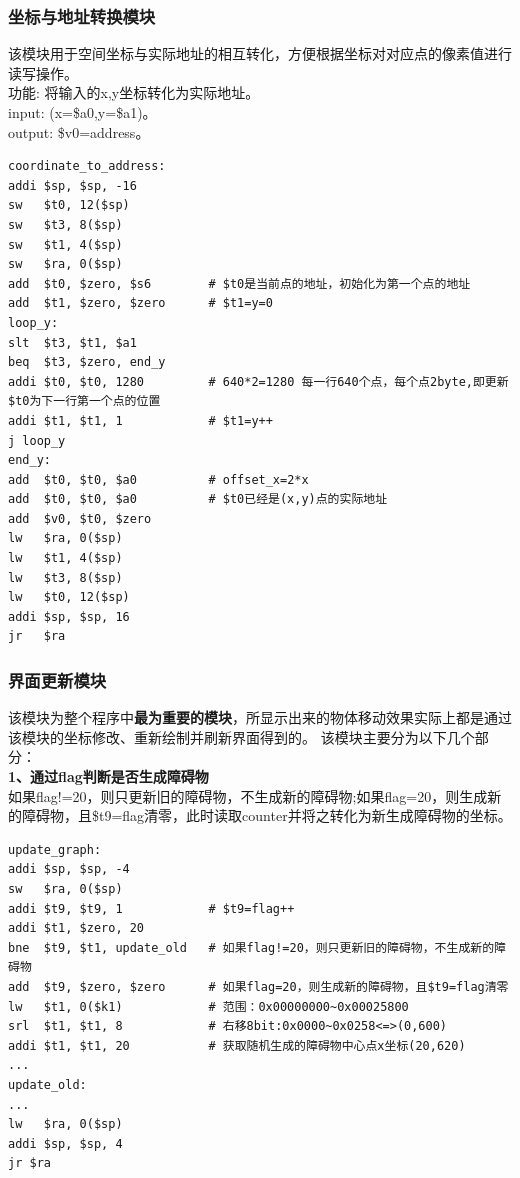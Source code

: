 \subsubsection{坐标与地址转换模块}
该模块用于空间坐标与实际地址的相互转化，方便根据坐标对对应点的像素值进行读写操作。\\
功能: 将输入的x,y坐标转化为实际地址。\\
input: (x=\$a0,y=\$a1)。\\
output: \$v0=address。\\

\begin{lstlisting}[frame=shadowbox]
coordinate_to_address:
addi $sp, $sp, -16
sw   $t0, 12($sp)
sw   $t3, 8($sp)
sw   $t1, 4($sp)
sw   $ra, 0($sp)
add  $t0, $zero, $s6        # $t0是当前点的地址，初始化为第一个点的地址
add  $t1, $zero, $zero      # $t1=y=0
loop_y:
slt  $t3, $t1, $a1 
beq  $t3, $zero, end_y
addi $t0, $t0, 1280         # 640*2=1280 每一行640个点，每个点2byte,即更新$t0为下一行第一个点的位置
addi $t1, $t1, 1            # $t1=y++
j loop_y
end_y:
add  $t0, $t0, $a0          # offset_x=2*x
add  $t0, $t0, $a0          # $t0已经是(x,y)点的实际地址
add  $v0, $t0, $zero
lw   $ra, 0($sp)
lw   $t1, 4($sp)
lw   $t3, 8($sp)
lw   $t0, 12($sp)
addi $sp, $sp, 16
jr   $ra
\end{lstlisting}

\subsubsection{界面更新模块}
该模块为整个程序中\textbf{最为重要的模块}，所显示出来的物体移动效果实际上都是通过该模块的坐标修改、重新绘制并刷新界面得到的。
该模块主要分为以下几个部分：\\

\textbf{1、通过flag判断是否生成障碍物}\\
如果flag!=20，则只更新旧的障碍物，不生成新的障碍物;如果flag=20，则生成新的障碍物，且\$t9=flag清零，此时读取counter并将之转化为新生成障碍物的坐标。\\

\begin{lstlisting}[frame=shadowbox]
update_graph:
addi $sp, $sp, -4
sw   $ra, 0($sp)
addi $t9, $t9, 1            # $t9=flag++
addi $t1, $zero, 20          
bne  $t9, $t1, update_old   # 如果flag!=20，则只更新旧的障碍物，不生成新的障碍物
add  $t9, $zero, $zero      # 如果flag=20，则生成新的障碍物，且$t9=flag清零
lw   $t1, 0($k1)            # 范围：0x00000000~0x00025800
srl  $t1, $t1, 8            # 右移8bit:0x0000~0x0258<=>(0,600)
addi $t1, $t1, 20           # 获取随机生成的障碍物中心点x坐标(20,620)
...
update_old:
...
lw   $ra, 0($sp)
addi $sp, $sp, 4
jr $ra
\end{lstlisting}

